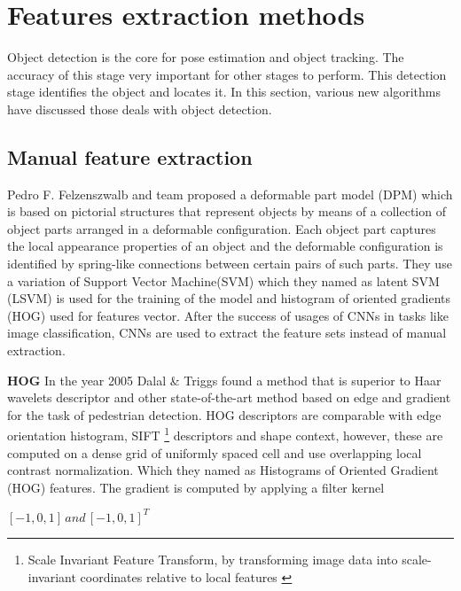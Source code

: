 \section{Features extraction methods}
Object detection \cite{felzenszwalb2009object, walk2010new, liu2016ssd, szegedy2014scalable, dollar2009pedestrian, dollar2011pedestrian} is the core for pose estimation and object tracking. The accuracy of this stage very important for other stages to perform. This detection stage identifies the object and locates it. In this section, various new algorithms have discussed those deals with object detection.

\subsection{Manual feature extraction}
Pedro F. Felzenszwalb and team proposed a deformable part model (DPM) \cite{felzenszwalb2009object} which is based on pictorial structures that represent objects by means of a collection of object parts arranged in a deformable configuration. Each object part captures the local appearance properties of
an object and the deformable configuration is identified by spring-like connections between certain pairs of such parts. They use a variation of Support Vector Machine(SVM) which they named as latent SVM (LSVM) is used for the training of the model and  histogram of oriented gradients (HOG) used for features vector. After the success of usages of CNNs in tasks like image classification, CNNs are used to extract the feature sets instead of manual extraction.

\newpara \textbf{HOG }
In the year 2005 Dalal \& Triggs found a method that is superior to Haar wavelets descriptor and other state-of-the-art method based on edge and gradient for the task of pedestrian detection. HOG descriptors are comparable with edge orientation histogram, SIFT \footnote{Scale Invariant Feature Transform, by transforming image data into scale-invariant coordinates relative to local features \cite{lowe2004distinctive}} descriptors and shape context, however, these are computed on a dense grid of uniformly spaced cell and use overlapping local contrast normalization. Which they named as Histograms of Oriented Gradient (HOG) features\cite{dalal2005histograms}. The gradient is computed by applying a filter kernel \\
\begin{center}
$[-1,0,1] \, and \, [-1,0,1] ^{T}$
\end{center}

